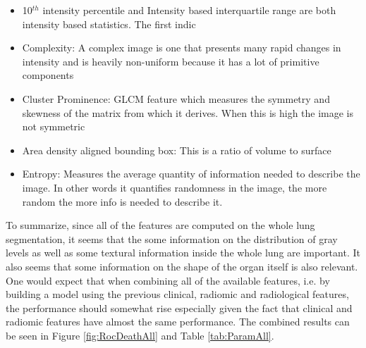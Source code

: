 \begin{itemize}
\item 10$^{th}$ intensity percentile and Intensity based interquartile range are both intensity based statistics. The first indic
\item Complexity: A complex image is one that presents many rapid changes in intensity and is heavily non-uniform because it has a lot of primitive components 
\item Cluster Prominence: GLCM feature which measures the symmetry and skewness of the matrix from which it derives. When this is high the image is not symmetric
\item Area density aligned bounding box: This is a ratio of volume to surface
\item Entropy: Measures the average quantity of information needed to describe the image. In other words it quantifies randomness in the image, the more random the more info is needed to describe it.
\end{itemize}

To summarize, since all of the features are computed on the whole lung segmentation, it seems that the some information on the distribution of gray levels as well as some textural information inside the whole lung are important. It also seems that some information on the shape of the organ itself is also relevant. One would expect that when combining all of the available features, i.e. by building a model using the previous clinical, radiomic and radiological features, the performance should somewhat rise especially given the fact that clinical and radiomic features have almost the same performance. The combined results can be seen in Figure \ref{fig:RocDeathAll} and Table \ref{tab:ParamAll}.

